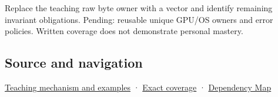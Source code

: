 Replace the teaching raw byte owner with a vector and identify remaining invariant obligations. Pending: reusable unique GPU/OS owners and error policies. Written coverage does not demonstrate personal mastery.

\subsection{Source and navigation}\label{appendix-7679107d057e-source-and-navigation}

\hyperref[01-foundations-i-ch003-from-three-repairs-to-five-decisions-to-zero-boilerplate]{Teaching mechanism and examples} · \hyperref[appendix-fd090d982a15-m009---parts-127-147]{Exact coverage} · \hyperref[appendix-4ad47bdd269a]{Dependency Map}
